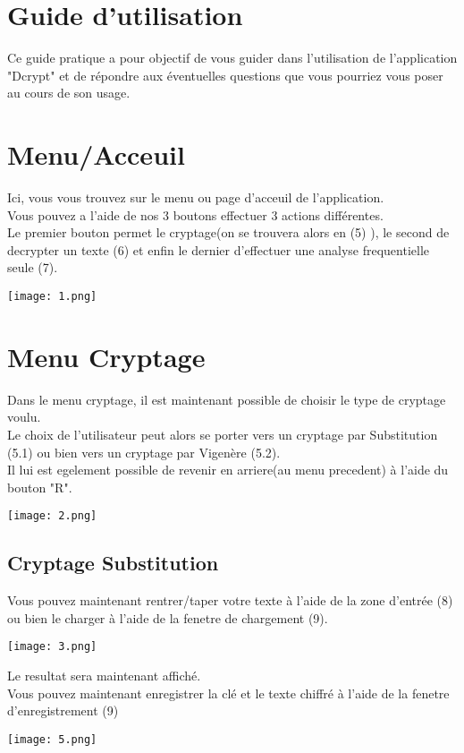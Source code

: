 \documentclass[a4]{article}
\begin{document}
	\section{Guide d'utilisation}
	
	
	Ce guide pratique a pour objectif de vous guider dans l’utilisation de l’application
"Dcrypt" et de répondre aux éventuelles questions que vous pourriez vous poser au
cours de son usage. 
	
	

	\section{Menu/Acceuil}
			Ici, vous vous trouvez sur le menu ou page d'acceuil de l'application. \\
			Vous pouvez a l'aide de nos 3 boutons effectuer 3 actions différentes.\\
			Le premier bouton permet le cryptage(on se trouvera alors en (5) ), le second de 
			decrypter un texte (6) et enfin le dernier d'effectuer une analyse frequentielle seule (7).
			\begin{center}\texttt{[image: 1.png]}\end{center}
			
			
			
	\section{Menu Cryptage}
		Dans le menu cryptage, il est maintenant possible de choisir le type de cryptage voulu.\\
		Le choix de l'utilisateur peut alors se porter vers un cryptage par Substitution (5.1) ou bien
		vers un cryptage par Vigenère (5.2).\\
		Il lui est egelement possible de revenir en arriere(au menu precedent) à l'aide du bouton "R".
		
		\begin{center}\texttt{[image: 2.png]}\end{center}
		\subsection{Cryptage Substitution}
			Vous pouvez maintenant rentrer/taper votre texte à l'aide de la zone d'entrée (8)
			ou bien le charger à l'aide de la fenetre de chargement (9).
			\begin{center}\texttt{[image: 3.png]}\end{center}
			Le resultat sera maintenant affiché. \\
			Vous pouvez maintenant enregistrer la clé et le texte chiffré à l'aide 
			de la fenetre d'enregistrement (9)
			\begin{center}\texttt{[image: 5.png]}\end{center}
\end{document}
